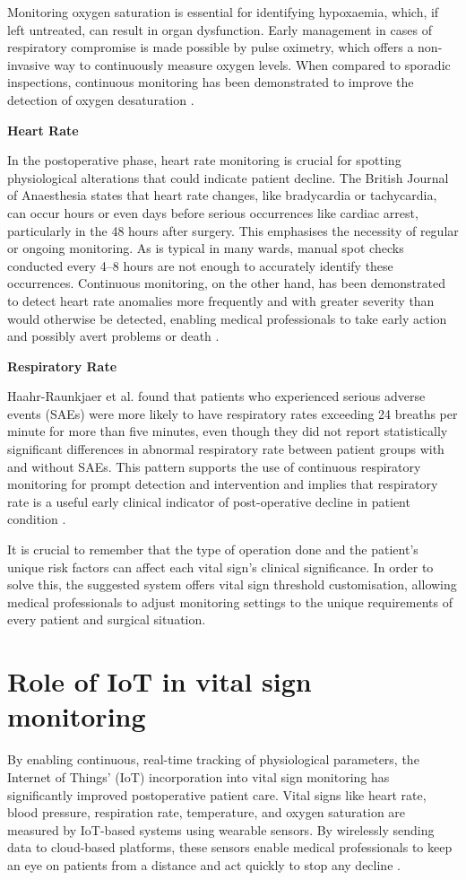 Monitoring oxygen saturation is essential for identifying hypoxaemia, which, if left untreated, can result in organ dysfunction. Early management in cases of respiratory compromise is made possible by pulse oximetry, which offers a non-invasive way to continuously measure oxygen levels. When compared to sporadic inspections, continuous monitoring has been demonstrated to improve the detection of oxygen desaturation \cite{Khanna2024_fz}.

\textbf{Heart Rate}

In the postoperative phase, heart rate monitoring is crucial for spotting physiological alterations that could indicate patient decline. The British Journal of Anaesthesia states that heart rate changes, like bradycardia or tachycardia, can occur hours or even days before serious occurrences like cardiac arrest, particularly in the 48 hours after surgery. This emphasises the necessity of regular or ongoing monitoring. As is typical in many wards, manual spot checks conducted every 4–8 hours are not enough to accurately identify these occurrences. Continuous monitoring, on the other hand, has been demonstrated to detect heart rate anomalies more frequently and with greater severity than would otherwise be detected, enabling medical professionals to take early action and possibly avert problems or death \cite{Khanna2025_sg}.

\textbf{Respiratory Rate}

Haahr-Raunkjaer et al. found that patients who experienced serious adverse events (SAEs) were more likely to have respiratory rates exceeding 24 breaths per minute for more than five minutes, even though they did not report statistically significant differences in abnormal respiratory rate between patient groups with and without SAEs. This pattern supports the use of continuous respiratory monitoring for prompt detection and intervention and implies that respiratory rate is a useful early clinical indicator of post-operative decline in patient condition \cite{Haahr_Raunkjaer2022_bo}.

It is crucial to remember that the type of operation done and the patient's unique risk factors can affect each vital sign's clinical significance. In order to solve this, the suggested system offers vital sign threshold customisation, allowing medical professionals to adjust monitoring settings to the unique requirements of every patient and surgical situation.

\section{Role of IoT in vital sign monitoring} %
By enabling continuous, real-time tracking of physiological parameters, the Internet of Things' (IoT) incorporation into vital sign monitoring has significantly improved postoperative patient care. Vital signs like heart rate, blood pressure, respiration rate, temperature, and oxygen saturation are measured by IoT-based systems using wearable sensors. By wirelessly sending data to cloud-based platforms, these sensors enable medical professionals to keep an eye on patients from a distance and act quickly to stop any decline \cite{Olusegun_2025_RT_patient}.

